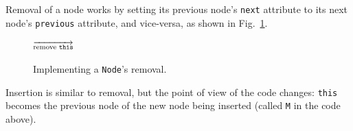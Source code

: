 \documentclass[a4paper]{book}
\theoremstyle{changebreak}                %
\begin{document}
Removal of a node works by setting its previous node's {\tt next}
attribute to its next node's {\tt previous} attribute, and vice-versa,
as shown in Fig.~\ref{f:list:remove:java}.
\begin{figure}[!ht]
\begin{center}
\begin{minipage}{5cm}
\begin{center}
\end{center}
\end{minipage}
$\overrightarrow{\mbox{\scriptsize remove {\tt this}}}$
\begin{minipage}{5cm}
\begin{center}
\end{center}
\end{minipage}
\end{center}
\caption{Implementing a {\tt Node}'s removal.}
\label{f:list:remove:java}
\end{figure}

Insertion is similar to removal, but the point of view of the code
changes: {\tt this} becomes the previous node of the new node being
inserted (called {\tt M} in the code above).
\end{document}
